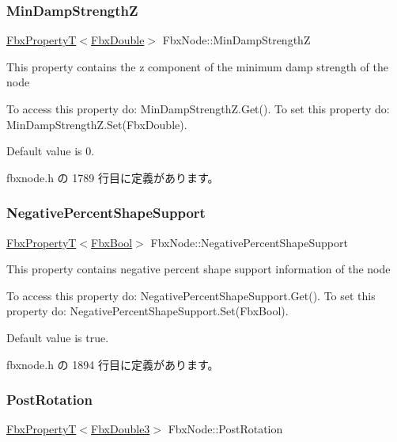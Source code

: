 \subsubsection{\texorpdfstring{Min\+Damp\+StrengthZ}{MinDampStrengthZ}}
{\footnotesize\ttfamily \hyperlink{class_fbx_property_t}{Fbx\+PropertyT}$<$\hyperlink{fbxtypes_8h_a171e72a1c46fc15c1a6c9c31948c1c5b}{Fbx\+Double}$>$ Fbx\+Node\+::\+Min\+Damp\+StrengthZ}

This property contains the z component of the minimum damp strength of the node

To access this property do\+: Min\+Damp\+Strength\+Z.\+Get(). To set this property do\+: Min\+Damp\+Strength\+Z.\+Set(\+Fbx\+Double).

Default value is 0. 

 fbxnode.\+h の 1789 行目に定義があります。

\mbox{\label{class_fbx_node_afa440edf621ff6e21b1c1abd626ac82a}} 
\subsubsection{\texorpdfstring{Negative\+Percent\+Shape\+Support}{NegativePercentShapeSupport}}
{\footnotesize\ttfamily \hyperlink{class_fbx_property_t}{Fbx\+PropertyT}$<$\hyperlink{fbxtypes_8h_a92e0562b2fe33e76a242f498b362262e}{Fbx\+Bool}$>$ Fbx\+Node\+::\+Negative\+Percent\+Shape\+Support}

This property contains negative percent shape support information of the node

To access this property do\+: Negative\+Percent\+Shape\+Support.\+Get(). To set this property do\+: Negative\+Percent\+Shape\+Support.\+Set(\+Fbx\+Bool).

Default value is true. 

 fbxnode.\+h の 1894 行目に定義があります。

\mbox{\label{class_fbx_node_a79bbc002a7cdb919db11525831a6a469}} 
\subsubsection{\texorpdfstring{Post\+Rotation}{PostRotation}}
{\footnotesize\ttfamily \hyperlink{class_fbx_property_t}{Fbx\+PropertyT}$<$\hyperlink{fbxtypes_8h_ae0a96f14cde566774c7553aa7523b7a7}{Fbx\+Double3}$>$ Fbx\+Node\+::\+Post\+Rotation}

